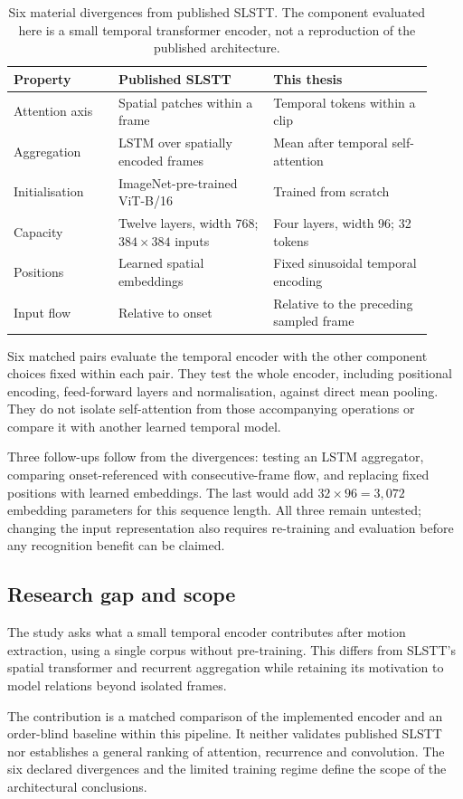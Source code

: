 \begin{table}[htbp]
    \centering
    \small
    \begin{tabular}{@{}p{0.23\linewidth} p{0.34\linewidth} p{0.35\linewidth}@{}}
        \hline
        \textbf{Property} & \textbf{Published SLSTT~\cite{zhang2022}} & \textbf{This thesis} \\
        \hline
        Attention axis & Spatial patches within a frame & Temporal tokens within a clip \\
        Aggregation & LSTM over spatially encoded frames & Mean after temporal self-attention \\
        Initialisation & ImageNet-pre-trained ViT-B/16 & Trained from scratch \\
        Capacity & Twelve layers, width 768; $384\times384$ inputs & Four layers, width 96; 32 tokens \\
        Positions & Learned spatial embeddings & Fixed sinusoidal temporal encoding \\
        Input flow & Relative to onset & Relative to the preceding sampled frame \\
        \hline
    \end{tabular}
    \caption[Divergences from published SLSTT]{Six material divergences from published SLSTT. The component evaluated here is a small temporal transformer encoder, not a reproduction of the published architecture.}
    \label{tab:slstt-divergences}
\end{table}

Six matched pairs evaluate the temporal encoder with the other component choices fixed within each pair. They test the whole encoder, including positional encoding, feed-forward layers and normalisation, against direct mean pooling. They do not isolate self-attention from those accompanying operations or compare it with another learned temporal model.

Three follow-ups follow from the divergences: testing an LSTM aggregator, comparing onset-referenced with consecutive-frame flow, and replacing fixed positions with learned embeddings. The last would add $32\times96=3{,}072$ embedding parameters for this sequence length. All three remain untested; changing the input representation also requires re-training and evaluation before any recognition benefit can be claimed.

\subsection{Research gap and scope}
\label{sec:transformer-gap}

The study asks what a small temporal encoder contributes after motion extraction, using a single corpus without pre-training. This differs from SLSTT's spatial transformer and recurrent aggregation while retaining its motivation to model relations beyond isolated frames.

The contribution is a matched comparison of the implemented encoder and an order-blind baseline within this pipeline. It neither validates published SLSTT nor establishes a general ranking of attention, recurrence and convolution. The six declared divergences and the limited training regime define the scope of the architectural conclusions.
